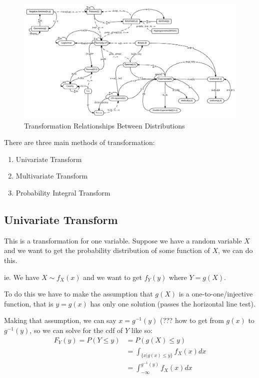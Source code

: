 \documentclass{report}
\begin{document}
\begin{figure}[ht!]
\centering
\includegraphics[scale=0.35]{transformations.png}
\caption{Transformation Relationships Between Distributions}
\end{figure}

There are three main methods of transformation:
\begin{enumerate}
\item Univariate Transform
\item Multivariate Transform
\item Probability Integral Transform
\end{enumerate}

\subsection{Univariate Transform}

This is a transformation for one variable. Suppose we have a random variable $X$ and we want to get the probability distribution of some function of $X$, we can do this. 

ie. We have $X \sim f_X(x)$ and we want to get $f_Y(y)$ where $Y=g(X)$.


To do this we have to make the assumption that $g(X)$ is a one-to-one/injective function, that is $y=g(x)$ has only one solution (passes the horizontal line test).

Making that assumption, we can say $x = g^{-1}(y)$ (??? how to get from $g(x)$ to $g^{-1}(y)$, so we can solve for the cdf of $Y$ like so: \begin{align*}
F_Y(y) = P(Y \leq y) & = P(g(X) \leq y) \\
& = \int_{ \{x|g(x) \leq y\} } f_X(x) dx \\
& = \int_{-\infty}^{g^{-1}(y)} f_X(x) dx\\
\end{align*}
\end{document}
